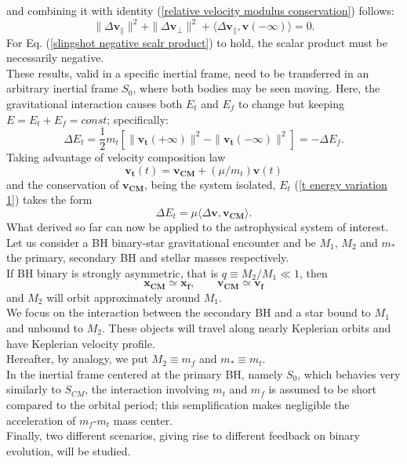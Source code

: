 and combining it with identity (\ref{relative velocity modulus conservation}) follows:
\begin{equation}\label{slingshot negative scalr product}
     \| \Delta\mathbf{v}_\parallel\|^2+  \| \Delta\mathbf{v}_\perp\|^2+\langle \Delta\mathbf{v}_\parallel, \mathbf{v}(-\infty) \rangle=0.
\end{equation}
For Eq. (\ref{slingshot negative scalr product}) to hold, the scalar product must be necessarily negative.\\These results, valid in a specific inertial frame, need to be transferred in an arbitrary inertial frame $S_0$, where both bodies may be seen moving. Here, the gravitational interaction causes both $E_t$ and $E_f$ to change but keeping $E=E_t+E_f=const$; specifically:
\begin{equation}\label{t energy variation 1}
    \Delta E_t=\frac{1}{2}m_t[\|\mathbf{v_t}(+\infty)\|^2-  \|\mathbf{v_t}(-\infty)\|^2]=-\Delta E_f.
\end{equation}
Taking advantage of velocity composition law
\begin{equation}
    \mathbf{v_t}(t)=\mathbf{v_{CM}}+(\mu/m_t)\mathbf{v}(t)
\end{equation}
and the conservation of $\mathbf{v_{CM}}$, being the system isolated, $E_t$ (\ref{t energy variation 1}) takes the form 
\begin{equation}
    \Delta E_t=\mu\langle \Delta\mathbf{v}, \mathbf{v_{CM}} \rangle.
\end{equation}
What derived so far can now be applied to the astrophysical system of interest.\\Let us consider a BH binary-star gravitational encounter and be $M_1$, $M_2$ and $m_*$ the primary, secondary BH and stellar masses respectively.\\If BH binary is strongly asymmetric, that is $q\equiv M_2/M_1\ll1$, then
\begin{equation}\label{Primary BH approx CM}
    \mathbf{x_{CM}}\simeq \mathbf{x_f}, \qquad\mathbf{v_{CM}}\simeq \mathbf{v_f}
\end{equation}
 and $M_2$ will orbit approximately around $M_1$.\\We focus on the interaction between the secondary BH and a star bound to $M_1$ and unbound to $M_2$. These objects will travel along nearly Keplerian orbits and have Keplerian velocity profile.\\Hereafter, by analogy, we put $M_2\equiv m_f$ and $m_*\equiv m_t$.\\In the inertial frame centered at the primary BH, namely $S_0$, which behavies very similarly to $S_{CM}$, the interaction involving $m_t$ and $m_f$ is assumed to be short compared to the orbital period; this semplification makes negligible the acceleration of $m_f$-$m_t$ mass center.\\Finally, two different scenarios, giving rise to different feedback on binary evolution, will be studied.

